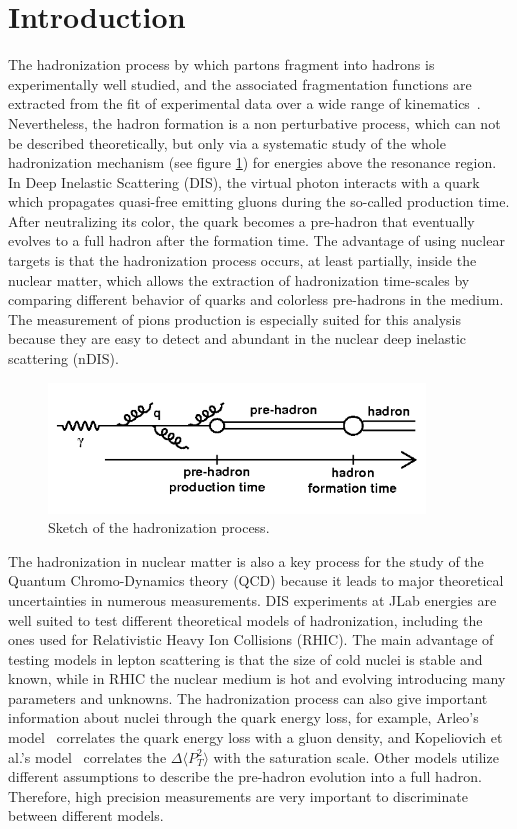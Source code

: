 
\section{Introduction}
\label{physics}

The hadronization process by which partons fragment into hadrons is 
experimentally well studied, and the associated fragmentation functions are extracted from the fit of experimental data over a wide range of kinematics~\cite{Albino:2008fy}. Nevertheless, the hadron formation is a non perturbative process, which can not be described theoretically, but only via a systematic study of the whole hadronization mechanism (see figure \ref{fig:hadro}) for energies above the resonance region. In Deep Inelastic Scattering (DIS), the virtual photon interacts with a quark which propagates quasi-free emitting gluons during the so-called production time. After neutralizing its color, the quark becomes a pre-hadron that eventually evolves to a full hadron after the formation time. The advantage of using nuclear targets is that the hadronization process occurs, at least partially, inside the nuclear matter, which allows the extraction of hadronization time-scales by comparing different behavior of quarks and colorless pre-hadrons in the medium. The measurement of pions production is especially suited for this analysis because they are easy to detect and abundant in the nuclear deep inelastic scattering (nDIS).

\begin{figure}[htbp]
\centering
\includegraphics[width=10cm] {fig/hadro.png} 
\caption {Sketch of the hadronization process.}
\label{fig:hadro}
\end{figure}

The hadronization in nuclear matter is also a key process for the study of the Quantum 
Chromo-Dynamics theory (QCD) because it leads to major theoretical 
uncertainties in numerous measurements. DIS experiments at JLab energies are 
well suited to test different theoretical models of hadronization, including 
the ones used for Relativistic Heavy Ion Collisions (RHIC). The main advantage 
of testing models in lepton scattering is that the size of cold nuclei is 
stable and known, while in RHIC the nuclear medium is hot and evolving 
introducing many parameters and unknowns. The hadronization process can also 
give important information about nuclei through the quark energy loss, for example, Arleo's model~\cite{Arleo:2003yf} correlates the quark energy loss with a gluon density, and Kopeliovich et al.'s model~\cite{Kopeliovich:2010aa} correlates the $\Delta \langle P_T^2 \rangle$ with the saturation scale. Other models \cite{Gallmeister:2007an} utilize different assumptions to describe the pre-hadron evolution into a full hadron. Therefore, high precision measurements are very important to discriminate between different models. 

